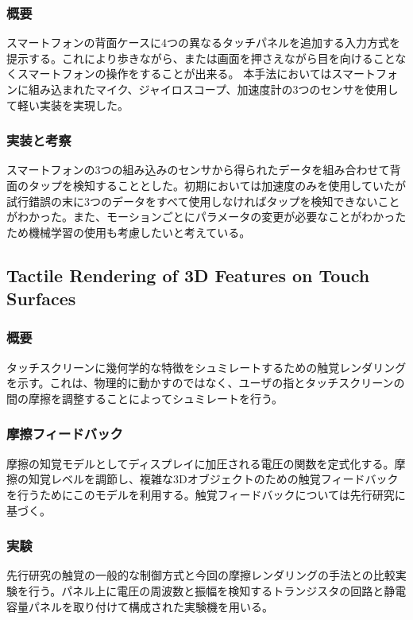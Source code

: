 \documentclass[11pt,a4paper]{jarticle}
\begin{document}
\subsubsection{概要}
スマートフォンの背面ケースに4つの異なるタッチパネルを追加する入力方式を提示する。これにより歩きながら、または画面を押さえながら目を向けることなくスマートフォンの操作をすることが出来る。
本手法においてはスマートフォンに組み込まれたマイク、ジャイロスコープ、加速度計の3つのセンサを使用して軽い実装を実現した。

\subsubsection{実装と考察}
スマートフォンの3つの組み込みのセンサから得られたデータを組み合わせて背面のタップを検知することとした。初期においては加速度のみを使用していたが試行錯誤の末に3つのデータをすべて使用しなければタップを検知できないことがわかった。また、モーションごとにパラメータの変更が必要なことがわかったため機械学習の使用も考慮したいと考えている。

\subsection{Tactile Rendering of 3D Features on Touch Surfaces\cite{Kim:2013}}
\subsubsection{概要}
タッチスクリーンに幾何学的な特徴をシュミレートするための触覚レンダリングを示す。これは、物理的に動かすのではなく、ユーザの指とタッチスクリーンの間の摩擦を調整することによってシュミレートを行う。

\subsubsection{摩擦フィードバック}
摩擦の知覚モデルとしてディスプレイに加圧される電圧の関数を定式化する。摩擦の知覚レベルを調節し、複雑な3Dオブジェクトのための触覚フィードバックを行うためにこのモデルを利用する。触覚フィードバックについては先行研究に基づく。

\subsubsection{実験}
先行研究の触覚の一般的な制御方式と今回の摩擦レンダリングの手法との比較実験を行う。パネル上に電圧の周波数と振幅を検知するトランジスタの回路と静電容量パネルを取り付けて構成された実験機を用いる。
\end{document}
